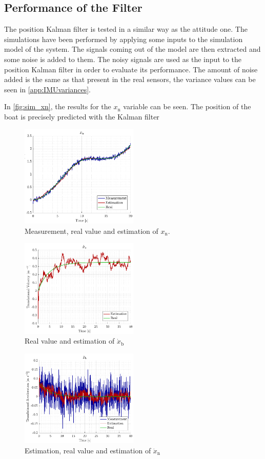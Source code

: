 \subsection{Performance of the Filter}
The position Kalman filter is tested in a similar way as the attitude one. The simulations have been performed by applying some inputs to the simulation model of the system. The signals coming out of the model are then extracted and some noise is added to them. The noisy signals are used as the input to the position Kalman filter in order to evaluate its performance. The amount of noise added is the same as that present in the real sensors, the variance values can be seen in \autoref{app:IMUvariances}.


In \autoref{fig:sim_xn}, the results for the $x_\mathrm{n}$ variable can be seen. The position of the boat is precisely predicted with the Kalman filter
\begin{figure}[H]
    \includegraphics[width=0.5\textwidth]{figures/sim_xn}
    \caption{Measurement, real value and estimation of $x_\mathrm{n}$.}
    \label{fig:sim_xn}
\end{figure}




\begin{figure}[H]
    \includegraphics[width=0.5\textwidth]{figures/sim_xbdot}
    \caption{Real value and estimation of $\dot{x}_\mathrm{b}$}
    \label{fig:sim_xbdot}
\end{figure}


\begin{figure}[H]
    \includegraphics[width=0.5\textwidth]{figures/sim_xbddot}
    \caption{Estimation, real value and estimation of $\ddot{x}_\mathrm{n}$}
    \label{fig:sim_xbddot}
\end{figure}